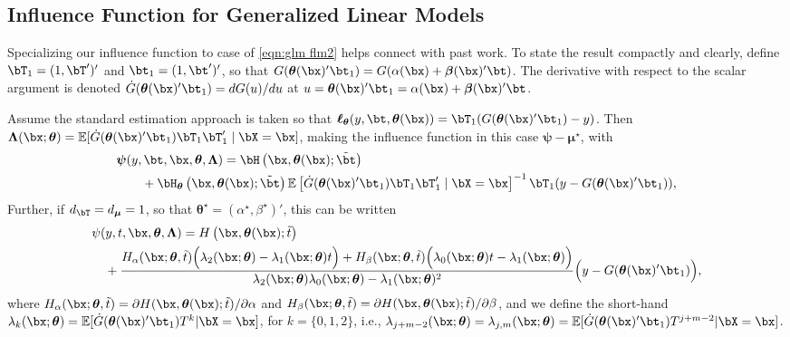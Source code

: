 \documentclass[12pt]{article}
\numberwithin{equation}{section}
\theoremstyle{definition}
\newcommand{\E}{\mathbb{E}}
\newcommand{\bmu}{\boldsymbol{\mu}}
\newcommand{\btheta}{\boldsymbol{\theta}}
\newcommand{\bbeta}{\boldsymbol{\beta}}
\newcommand{\bpsi}{\boldsymbol{\psi}}
\newcommand{\bL}{\boldsymbol{\Lambda}}
\newcommand{\bmtrue}{\bmu^\star}
\newcommand{\bttrue}{\btheta^\star}
\newcommand{\atrue}{\alpha^\star}
\newcommand{\btrue}{\beta^\star}
\newcommand{\btstar}{\tilde{\bt}}
\newcommand{\tstar}{\tilde{t}}
\newcommand{\dt}{d_{\bT}}  %
\newcommand{\dmu}{d_{\bmu}}  %
\begin{document}
\begin{appendices}
\subsection{Influence Function for Generalized Linear Models}

Specializing our influence function to case of \eqref{eqn:glm flm2} helps connect with past work. To state the result compactly and clearly, define $\bT_1 = (1,\bT')'$ and $\bt_1 = (1,\bt')'$, so that $G(\btheta(\bx)'\bt_1) = G(\alpha(\bx) + \bbeta(\bx)'\bt)$. The derivative with respect to the scalar argument is denoted $\dot{G}(\btheta(\bx)'\bt_1) = d G(u) / d u$ at $u = \btheta(\bx)'\bt_1 = \alpha(\bx) + \bbeta(\bx)'\bt$.

Assume the standard estimation approach is taken so that $\bm{\ell}_{\btheta}(y,\bt, \btheta(\bx)) =  \bT_1(G(\btheta(\bx)'\bt_1)-y)$. Then $\bL(\bx; \btheta) = \E[\dot{G}(\btheta(\bx)'\bt_1)\bT_1\bT_1'\mid\bX=\bx]$, making the influence function in this case $\bpsi - \bmtrue$, with
\begin{align}
    \begin{split}
    \label{eqn:glm IF}
        & \bpsi(y,\bt,\bx, \btheta, \bL)  =  \bH\left(\bx, \btheta(\bx); \btstar\right)  
        \\
        & \qquad  + \bH_{\btheta}\left(\bx, \btheta(\bx ); \btstar\right) \E\left[\dot{G}(\btheta(\bx)'\bt_1)\bT_1\bT_1'\mid\bX=\bx\right]^{-1} \bT_1 (y - G(\btheta(\bx)'\bt_1)),
    \end{split}
\end{align}
Further, if $\dt = \dmu = 1$, so that $\bttrue = (\atrue,\btrue)'$, this can be written
\begin{align}
    \begin{split}
    \label{eqn:IF univariate}			
		& \psi(y, t, \bx, \btheta, \bL) 
         = H\left(\bx, \btheta(\bx); \tstar \right)     		\\
			& \quad    +    \frac{H_\alpha(\bx; \btheta, \tstar) \Big(\lambda_2(\bx; \btheta) - \lambda_1(\bx; \btheta) t \Big) +    H_\beta(\bx; \btheta, \tstar) \Big(\lambda_0(\bx; \btheta) t - \lambda_1(\bx; \btheta) \Big)}{\lambda_2(\bx; \btheta)\lambda_0(\bx; \btheta) - \lambda_1(\bx; \btheta)^2} \Big(y - G(\btheta(\bx)'\bt_1) \Big),
		\end{split}
\end{align}
where $H_\alpha(\bx; \btheta, \tstar) = \partial H(\bx, \btheta(\bx); \tstar)/\partial \alpha$ and $H_\beta(\bx; \btheta, \tstar) = \partial H(\bx, \btheta(\bx); \tstar)/\partial \beta$, and we define the short-hand $\lambda_k(\bx; \btheta) = \E [ \dot{G}(\btheta(\bx)'\bt_1)  T^k | \bX = \bx ]$, for $k=\{0,1,2\}$, i.e., $\lambda_{j+m-2}(\bx; \btheta) = \lambda_{j,m}(\bx; \btheta) = \E [ \dot{G}(\btheta(\bx)'\bt_1)  T^{j+m-2} | \bX = \bx ]$.


\end{appendices}
\end{document}
